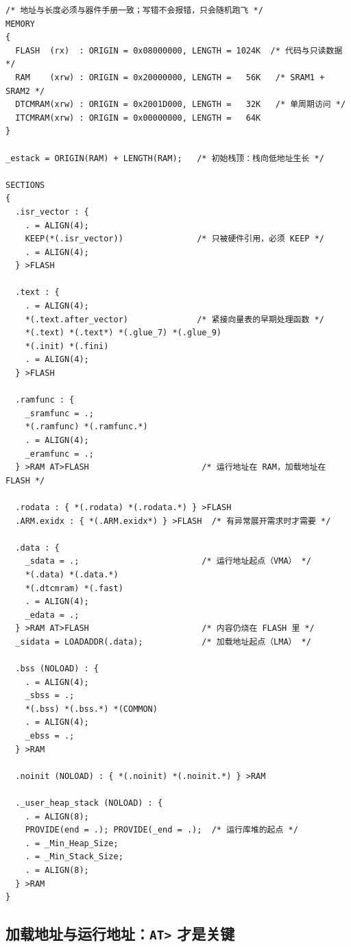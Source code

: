 \documentclass[12pt,a4paper,fontset=fandol]{ctexbook}
\newcommand{\Tp}[1]{\texttt{#1}}
\begin{document}
\begin{lstlisting}[style=cstyle,caption={链接脚本片段：向量表、双地址 \Tp{.data}、带断言的堆栈预留},label={lst:ch01-linker}]
/* 地址与长度必须与器件手册一致；写错不会报错，只会随机跑飞 */
MEMORY
{
  FLASH  (rx)  : ORIGIN = 0x08000000, LENGTH = 1024K  /* 代码与只读数据 */
  RAM    (xrw) : ORIGIN = 0x20000000, LENGTH =   56K   /* SRAM1 + SRAM2 */
  DTCMRAM(xrw) : ORIGIN = 0x2001D000, LENGTH =   32K   /* 单周期访问 */
  ITCMRAM(xrw) : ORIGIN = 0x00000000, LENGTH =   64K
}

_estack = ORIGIN(RAM) + LENGTH(RAM);   /* 初始栈顶：栈向低地址生长 */

SECTIONS
{
  .isr_vector : {
    . = ALIGN(4);
    KEEP(*(.isr_vector))               /* 只被硬件引用，必须 KEEP */
    . = ALIGN(4);
  } >FLASH

  .text : {
    . = ALIGN(4);
    *(.text.after_vector)              /* 紧接向量表的早期处理函数 */
    *(.text) *(.text*) *(.glue_7) *(.glue_9)
    *(.init) *(.fini)
    . = ALIGN(4);
  } >FLASH

  .ramfunc : {
    _sramfunc = .;
    *(.ramfunc) *(.ramfunc.*)
    . = ALIGN(4);
    _eramfunc = .;
  } >RAM AT>FLASH                       /* 运行地址在 RAM，加载地址在 FLASH */

  .rodata : { *(.rodata) *(.rodata.*) } >FLASH
  .ARM.exidx : { *(.ARM.exidx*) } >FLASH  /* 有异常展开需求时才需要 */

  .data : {
    _sdata = .;                         /* 运行地址起点（VMA） */
    *(.data) *(.data.*)
    *(.dtcmram) *(.fast)
    . = ALIGN(4);
    _edata = .;
  } >RAM AT>FLASH                       /* 内容仍烧在 FLASH 里 */
  _sidata = LOADADDR(.data);            /* 加载地址起点（LMA） */

  .bss (NOLOAD) : {
    . = ALIGN(4);
    _sbss = .;
    *(.bss) *(.bss.*) *(COMMON)
    . = ALIGN(4);
    _ebss = .;
  } >RAM

  .noinit (NOLOAD) : { *(.noinit) *(.noinit.*) } >RAM

  ._user_heap_stack (NOLOAD) : {
    . = ALIGN(8);
    PROVIDE(end = .); PROVIDE(_end = .);  /* 运行库堆的起点 */
    . = _Min_Heap_Size;
    . = _Min_Stack_Size;
    . = ALIGN(8);
  } >RAM
}
\end{lstlisting}

\subsection{加载地址与运行地址：\Tp{AT>} 才是关键}
\end{document}
